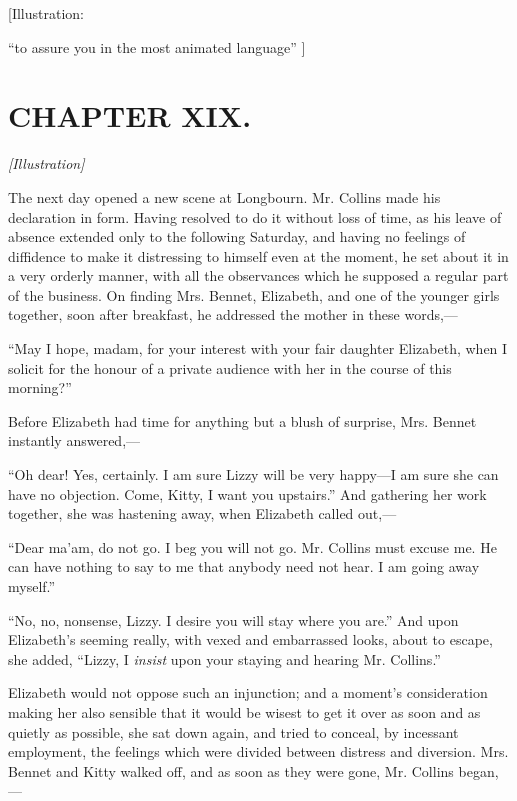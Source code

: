\documentclass[12pt]{book}
\begin{document}
[Illustration:

``to assure you in the most animated language'' ]

\chapter{CHAPTER XIX.}

\emph{[Illustration]}

The next day opened a new scene at Longbourn. Mr. Collins made his declaration in form. Having resolved to do it without loss of time, as his leave of absence extended only to the following Saturday, and having no feelings of diffidence to make it distressing to himself even at the moment, he set about it in a very orderly manner, with all the observances which he supposed a regular part of the business. On finding Mrs. Bennet, Elizabeth, and one of the younger girls together, soon after breakfast, he addressed the mother in these words,---

``May I hope, madam, for your interest with your fair daughter Elizabeth, when I solicit for the honour of a private audience with her in the course of this morning?''

Before Elizabeth had time for anything but a blush of surprise, Mrs. Bennet instantly answered,---

``Oh dear! Yes, certainly. I am sure Lizzy will be very happy---I am sure she can have no objection. Come, Kitty, I want you upstairs.'' And gathering her work together, she was hastening away, when Elizabeth called out,---

``Dear ma'am, do not go. I beg you will not go. Mr. Collins must excuse me. He can have nothing to say to me that anybody need not hear. I am going away myself.''

``No, no, nonsense, Lizzy. I desire you will stay where you are.'' And upon Elizabeth's seeming really, with vexed and embarrassed looks, about to escape, she added, ``Lizzy, I \textit{insist} upon your staying and hearing Mr. Collins.''

Elizabeth would not oppose such an injunction; and a moment's consideration making her also sensible that it would be wisest to get it over as soon and as quietly as possible, she sat down again, and tried to conceal, by incessant employment, the feelings which were divided between distress and diversion. Mrs. Bennet and Kitty walked off, and as soon as they were gone, Mr. Collins began,---
\end{document}
